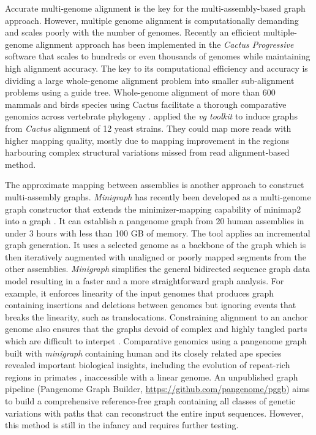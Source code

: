 \documentclass[../main.tex]{subfiles}
\begin{document}
Accurate multi-genome alignment is the key for the multi-assembly-based graph approach. However, multiple genome alignment is computationally demanding and scales poorly with the number of genomes. Recently an efficient multiple-genome alignment approach has been implemented in the \emph{Cactus Progressive} software \citep{armstrong2020progressive} that scales to hundreds or even  thousands of genomes while maintaining high alignment accuracy. The key to its computational efficiency and accuracy is dividing a large whole-genome alignment problem into smaller sub-alignment problems using a guide tree. Whole-genome alignment of more than 600 mammals and birds species using Cactus facilitate a thorough comparative genomics across vertebrate phylogeny \citep{feng2020dense,Genereux2020}.
\citet{hickey2020genotyping} applied the \emph{vg toolkit} to induce graphs from \emph{Cactus} alignment of 12 yeast strains. They could map more reads with higher mapping quality, mostly due to mapping improvement in the regions harbouring complex structural variations missed from read alignment-based method. 

The approximate mapping between assemblies is another approach to construct multi-assembly graphs. \emph{Minigraph} \citep{li2020design} has recently been developed as a multi-genome graph constructor that extends the minimizer-mapping capability of minimap2 into a graph \citep{li2018minimap2}. It can establish a pangenome graph from 20 human assemblies in under 3 hours with less than 100 GB of memory. The tool applies an incremental graph generation. It uses  a selected genome as a backbone of the graph which is then iteratively augmented with unaligned or poorly mapped segments from the other assemblies. \emph{Minigraph} simplifies the general bidirected sequence graph data model resulting in a faster and a more straightforward graph analysis. For example, it enforces linearity of the input genomes that produces graph containing insertions and deletions between genomes but ignoring events that breaks the linearity, such as translocations. Constraining alignment to an anchor genome also ensures that the graphs devoid of complex and highly tangled parts which are difficult to interpet \citep{Lei2021}. Comparative genomics using a pangenome graph built with \emph{minigraph} containing human and its closely related ape species revealed important biological insights, including the evolution of repeat-rich regions in primates \citep{li2020design}, inaccessible  with a linear genome. An unpublished graph pipeline (Pangenome Graph Builder, \url{https://github.com/pangenome/pggb}) aims to build a comprehensive reference-free graph containing all classes of genetic variations with paths that can reconstruct the entire input sequences. However, this method is still in the infancy and requires further testing. \\
\end{document}
